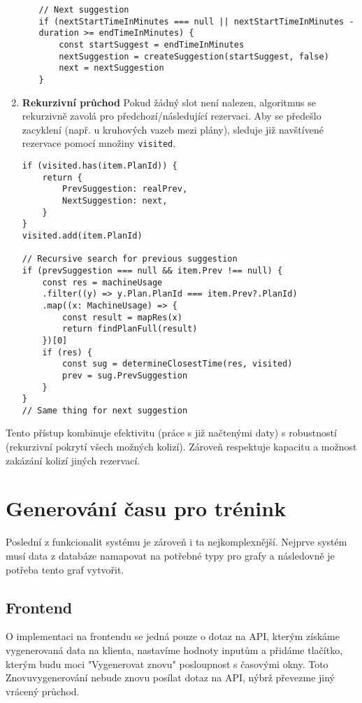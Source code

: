 \begin{enumerate}
\begin{itemize}
\begin{lstlisting}
// Next suggestion
if (nextStartTimeInMinutes === null || nextStartTimeInMinutes - duration >= endTimeInMinutes) {
    const startSuggest = endTimeInMinutes
    nextSuggestion = createSuggestion(startSuggest, false)
    next = nextSuggestion
}
    \end{lstlisting}
    \end{itemize}

    \item \textbf{Rekurzivní průchod}
    Pokud žádný slot není nalezen, algoritmus se rekurzivně zavolá pro předchozí/následující rezervaci. Aby se předešlo zacyklení (např. u kruhových vazeb mezi plány), sleduje již navštívené rezervace pomocí množiny \texttt{visited}.

    \begin{lstlisting}
if (visited.has(item.PlanId)) {
    return {
	    PrevSuggestion: realPrev,
	    NextSuggestion: next,
    }
}
visited.add(item.PlanId)

// Recursive search for previous suggestion
if (prevSuggestion === null && item.Prev !== null) {
    const res = machineUsage
	.filter((y) => y.Plan.PlanId === item.Prev?.PlanId)
	.map((x: MachineUsage) => {
	    const result = mapRes(x)
	    return findPlanFull(result)
	})[0]
    if (res) {
	    const sug = determineClosestTime(res, visited)
	    prev = sug.PrevSuggestion
    }
}
// Same thing for next suggestion
    \end{lstlisting}
\end{enumerate}

Tento přístup kombinuje efektivitu (práce s již načtenými daty) s robustností (rekurzivní pokrytí všech možných kolizí). Zároveň respektuje kapacitu a možnost zakázání kolizí jiných rezervací. 
\section{Generování času pro trénink}

Poslední z funkcionalit systému je zároveň i ta nejkomplexnější. Nejprve systém musí data z databáze namapovat na potřebné typy pro grafy a následovně je potřeba tento graf vytvořit. 

\subsection{Frontend}
O implementaci na frontendu se jedná pouze o dotaz na API, kterým získáme vygenerovaná data na klienta, nastavíme hodnoty inputům a přidáme tlačítko, kterým budu moci "Vygenerovat znovu" posloupnost s časovými okny. Toto Znovuvygenerování nebude znovu posílat dotaz na API, nýbrž převezme jiný vrácený průchod.

